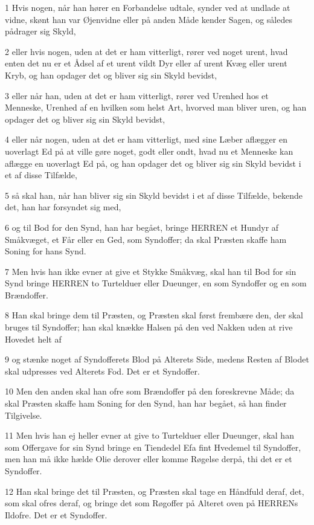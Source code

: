\par 1 Hvis nogen, når han hører en Forbandelse udtale, synder ved at undlade at vidne, skønt han var Øjenvidne eller på anden Måde kender Sagen, og således pådrager sig Skyld,
\par 2 eller hvis nogen, uden at det er ham vitterligt, rører ved noget urent, hvad enten det nu er et Ådsel af et urent vildt Dyr eller af urent Kvæg eller urent Kryb, og han opdager det og bliver sig sin Skyld bevidst,
\par 3 eller når han, uden at det er ham vitterligt, rører ved Urenhed hos et Menneske, Urenhed af en hvilken som helst Art, hvorved man bliver uren, og han opdager det og bliver sig sin Skyld bevidst,
\par 4 eller når nogen, uden at det er ham vitterligt, med sine Læber aflægger en uoverlagt Ed på at ville gøre noget, godt eller ondt, hvad nu et Menneske kan aflægge en uoverlagt Ed på, og han opdager det og bliver sig sin Skyld bevidst i et af disse Tilfælde,
\par 5 så skal han, når han bliver sig sin Skyld bevidst i et af disse Tilfælde, bekende det, han har forsyndet sig med,
\par 6 og til Bod for den Synd, han har begået, bringe HERREN et Hundyr af Småkvæget, et Får eller en Ged, som Syndoffer; da skal Præsten skaffe ham Soning for hans Synd.
\par 7 Men hvis han ikke evner at give et Stykke Småkvæg, skal han til Bod for sin Synd bringe HERREN to Turtelduer eller Dueunger, en som Syndoffer og en som Brændoffer.
\par 8 Han skal bringe dem til Præsten, og Præsten skal først frembære den, der skal bruges til Syndoffer; han skal knække Halsen på den ved Nakken uden at rive Hovedet helt af
\par 9 og stænke noget af Syndofferets Blod på Alterets Side, medens Resten af Blodet skal udpresses ved Alterets Fod. Det er et Syndoffer.
\par 10 Men den anden skal han ofre som Brændoffer på den foreskrevne Måde; da skal Præsten skaffe ham Soning for den Synd, han har begået, så han finder Tilgivelse.
\par 11 Men hvis han ej heller evner at give to Turtelduer eller Dueunger, skal han som Offergave for sin Synd bringe en Tiendedel Efa fint Hvedemel til Syndoffer, men han må ikke hælde Olie derover eller komme Røgelse derpå, thi det er et Syndoffer.
\par 12 Han skal bringe det til Præsten, og Præsten skal tage en Håndfuld deraf, det, som skal ofres deraf, og bringe det som Røgoffer på Alteret oven på HERRENs Ildofre. Det er et Syndoffer.
